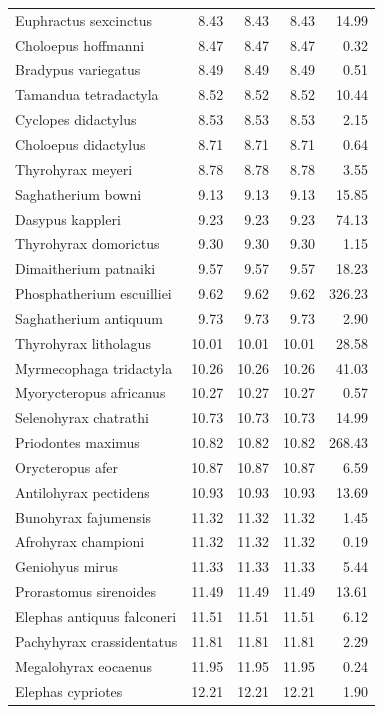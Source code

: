 \documentclass[]{elsarticle} %
\begin{document}
\begin{longtable}[t]{lrrrr}
Euphractus sexcinctus & 8.43 & 8.43 & 8.43 & 14.99\\
Choloepus hoffmanni & 8.47 & 8.47 & 8.47 & 0.32\\
Bradypus variegatus & 8.49 & 8.49 & 8.49 & 0.51\\
Tamandua tetradactyla & 8.52 & 8.52 & 8.52 & 10.44\\
\addlinespace
Cyclopes didactylus & 8.53 & 8.53 & 8.53 & 2.15\\
Choloepus didactylus & 8.71 & 8.71 & 8.71 & 0.64\\
Thyrohyrax meyeri & 8.78 & 8.78 & 8.78 & 3.55\\
Saghatherium bowni & 9.13 & 9.13 & 9.13 & 15.85\\
Dasypus kappleri & 9.23 & 9.23 & 9.23 & 74.13\\
\addlinespace
Thyrohyrax domorictus & 9.30 & 9.30 & 9.30 & 1.15\\
Dimaitherium patnaiki & 9.57 & 9.57 & 9.57 & 18.23\\
Phosphatherium escuilliei & 9.62 & 9.62 & 9.62 & 326.23\\
Saghatherium antiquum & 9.73 & 9.73 & 9.73 & 2.90\\
Thyrohyrax litholagus & 10.01 & 10.01 & 10.01 & 28.58\\
\addlinespace
Myrmecophaga tridactyla & 10.26 & 10.26 & 10.26 & 41.03\\
Myorycteropus africanus & 10.27 & 10.27 & 10.27 & 0.57\\
Selenohyrax chatrathi & 10.73 & 10.73 & 10.73 & 14.99\\
Priodontes maximus & 10.82 & 10.82 & 10.82 & 268.43\\
Orycteropus afer & 10.87 & 10.87 & 10.87 & 6.59\\
\addlinespace
Antilohyrax pectidens & 10.93 & 10.93 & 10.93 & 13.69\\
Bunohyrax fajumensis & 11.32 & 11.32 & 11.32 & 1.45\\
Afrohyrax championi & 11.32 & 11.32 & 11.32 & 0.19\\
Geniohyus mirus & 11.33 & 11.33 & 11.33 & 5.44\\
Prorastomus sirenoides & 11.49 & 11.49 & 11.49 & 13.61\\
\addlinespace
Elephas antiquus falconeri & 11.51 & 11.51 & 11.51 & 6.12\\
Pachyhyrax crassidentatus & 11.81 & 11.81 & 11.81 & 2.29\\
Megalohyrax eocaenus & 11.95 & 11.95 & 11.95 & 0.24\\
Elephas cypriotes & 12.21 & 12.21 & 12.21 & 1.90\\

\end{longtable}
\end{document}
